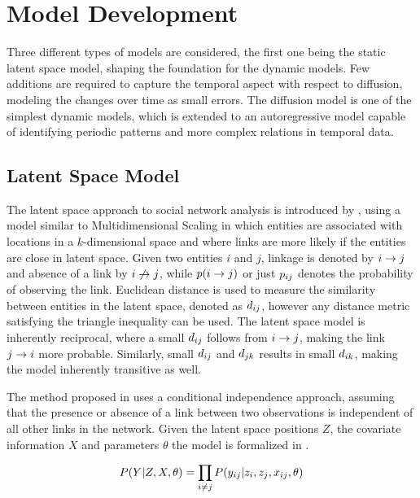 \section{Model Development}

Three different types of models are considered, the first one being the static latent space model, shaping the foundation for the dynamic models.
Few additions are required to capture the temporal aspect with respect to diffusion, modeling the changes over time as small errors. The diffusion model is one of the simplest dynamic models, which is extended to an autoregressive model capable of identifying periodic patterns and more complex relations in temporal data.

\subsection{Latent Space Model}

    The latent space approach to social network analysis is introduced by \citeauthor{hoff2002latent} \cite{hoff2002latent}, using a model similar to Multidimensional Scaling in which entities are associated with locations in a $k$-dimensional space and where links are more likely if the entities are close in latent space.
    Given two entities $i$ and $j$, linkage is denoted by $\link$ and absence of a link by $\link*$, while $p(\link)$ or just $\sub(p)$ denotes the probability of observing the link. 
    Euclidean distance is used to measure the similarity between entities in the latent space, denoted as $\sub(d)$, however any distance metric satisfying the triangle inequality can be used.
    The latent space model is inherently reciprocal, where a small $\sub(d)$ follows from $\link$, making the link $\link(j)(i)$ more probable. Similarly, small $\sub(d)$ and $\sub(d)(jk)$ results in small $\sub(d)(ik)$, making the model inherently transitive as well.
    
    The method proposed in \cite{hoff2002latent} uses a conditional independence approach, assuming that the presence or absence of a link between two observations is independent of all other links in the network. Given the latent space positions $Z$, the covariate information $X$ and parameters $\theta$ the model is formalized in . 
    
    \begin{equation}\label{eq:lsm-link-proba}
        P(Y|Z,X,\theta) = \prod_{i\neq j} P(\sub(y)|z_i,z_j,\sub(x),\theta)
    \end{equation}
    
